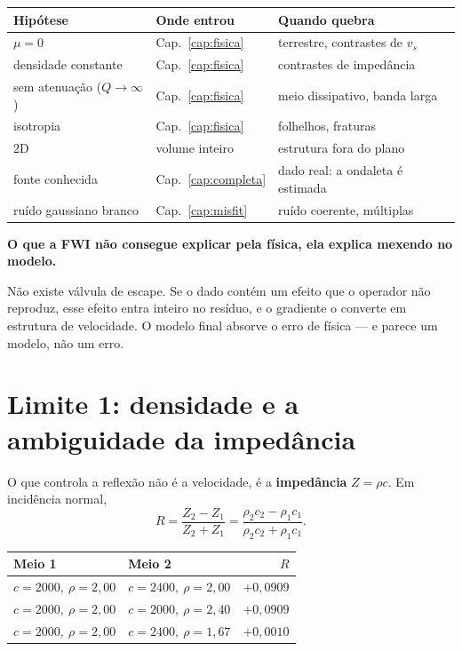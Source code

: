 \documentclass[11pt,a4paper,oneside]{report}
\begin{document}
\begin{center}
\begin{tabular}{@{}lll@{}}
\toprule
\textbf{Hip\'otese} & \textbf{Onde entrou} & \textbf{Quando quebra} \\
\midrule
$\mu = 0$ & Cap.~\ref{cap:fisica} & terrestre, contrastes de $v_s$ \\
densidade constante & Cap.~\ref{cap:fisica} & contrastes de imped\^ancia \\
sem atenua\c{c}\~ao ($Q\to\infty$) & Cap.~\ref{cap:fisica} & meio dissipativo,
  banda larga \\
isotropia & Cap.~\ref{cap:fisica} & folhelhos, fraturas \\
2D & volume inteiro & estrutura fora do plano \\
fonte conhecida & Cap.~\ref{cap:completa} & dado real: a ondaleta \'e estimada \\
ru\'ido gaussiano branco & Cap.~\ref{cap:misfit} & ru\'ido coerente, m\'ultiplas \\
\bottomrule
\end{tabular}
\end{center}

\begin{armadilha}
\textbf{O que a FWI n\~ao consegue explicar pela f\'isica, ela explica mexendo
no modelo.}

N\~ao existe v\'alvula de escape. Se o dado cont\'em um efeito que o operador
n\~ao reproduz, esse efeito entra inteiro no res\'iduo, e o gradiente o
converte em estrutura de velocidade. O modelo final absorve o erro de
f\'isica --- e parece um modelo, n\~ao um erro.
\end{armadilha}

\section{Limite 1: densidade e a ambiguidade da imped\^ancia}

O que controla a reflex\~ao n\~ao \'e a velocidade, \'e a \textbf{imped\^ancia}
$Z = \rho c$. Em incid\^encia normal,
\begin{equation}
R = \frac{Z_2 - Z_1}{Z_2 + Z_1}
  = \frac{\rho_2 c_2 - \rho_1 c_1}{\rho_2 c_2 + \rho_1 c_1}.
\end{equation}

\begin{center}
\begin{tabular}{@{}llr@{}}
\toprule
\textbf{Meio 1} & \textbf{Meio 2} & $R$ \\
\midrule
$c=2000,\ \rho=2{,}00$ & $c=2400,\ \rho=2{,}00$ & $+0{,}0909$ \\
$c=2000,\ \rho=2{,}00$ & $c=2000,\ \rho=2{,}40$ & $+0{,}0909$ \\
$c=2000,\ \rho=2{,}00$ & $c=2400,\ \rho=1{,}67$ & $+0{,}0010$ \\
\bottomrule
\end{tabular}
\end{center}
\end{document}
